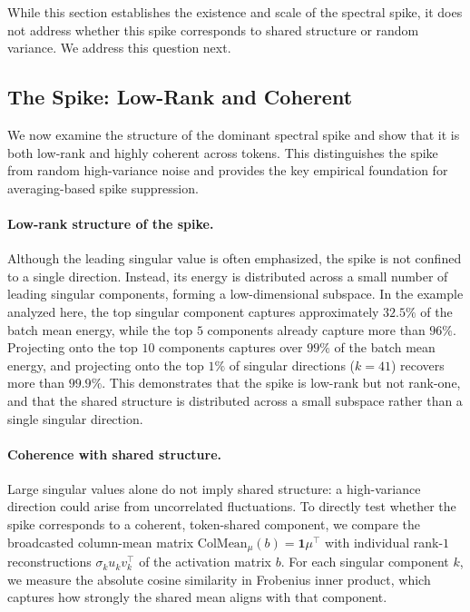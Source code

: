 While this section establishes the existence and scale of the spectral spike, it
does not address whether this spike corresponds to shared structure or random
variance.
We address this question next.


\subsection{The Spike: Low-Rank and Coherent}
\label{subsec:spike_coherent}

We now examine the structure of the dominant spectral spike and show that it is
both low-rank and highly coherent across tokens.
This distinguishes the spike from random high-variance noise and provides the
key empirical foundation for averaging-based spike suppression.

\paragraph{Low-rank structure of the spike.}
Although the leading singular value is often emphasized, the spike is not
confined to a single direction.
Instead, its energy is distributed across a small number of leading singular
components, forming a low-dimensional subspace.
In the example analyzed here, the top singular component captures approximately
$32.5\%$ of the batch mean energy, while the top $5$ components already capture
more than $96\%$.
Projecting onto the top $10$ components captures over $99\%$ of the batch mean
energy, and projecting onto the top $1\%$ of singular directions ($k=41$)
recovers more than $99.9\%$.
This demonstrates that the spike is low-rank but not rank-one, and that the
shared structure is distributed across a small subspace rather than a single
singular direction.

\paragraph{Coherence with shared structure.}
Large singular values alone do not imply shared structure: a high-variance
direction could arise from uncorrelated fluctuations.
To directly test whether the spike corresponds to a coherent, token-shared
component, we compare the broadcasted column-mean matrix
$\mathrm{ColMean}_{\mu}(b)=\mathbf{1}\mu^\top$ with individual rank-$1$
reconstructions $\sigma_k u_k v_k^\top$ of the activation matrix $b$.
For each singular component $k$, we measure the absolute cosine similarity in
Frobenius inner product, which captures how strongly the shared mean aligns with
that component.

